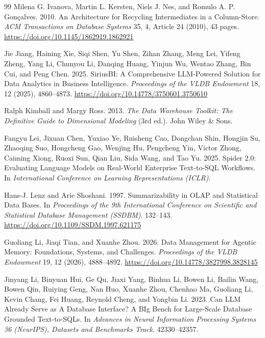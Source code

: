 \begin{thebibliography}{99}
Milena G. Ivanova, Martin L. Kersten, Niels J. Nes, and Romulo A. P. Gon{\c{c}}alves. 2010. An Architecture for Recycling Intermediates in a Column-Store. \emph{ACM Transactions on Database Systems} 35, 4, Article 24 (2010), 43 pages. \url{https://doi.org/10.1145/1862919.1862921}

Jie Jiang, Haining Xie, Siqi Shen, Yu Shen, Zihan Zhang, Meng Lei, Yifeng Zheng, Yang Li, Chunyou Li, Danqing Huang, Yinjun Wu, Wentao Zhang, Bin Cui, and Peng Chen. 2025. SiriusBI: A Comprehensive LLM-Powered Solution for Data Analytics in Business Intelligence. \emph{Proceedings of the VLDB Endowment} 18, 12 (2025), 4860--4873. \url{https://doi.org/10.14778/3750601.3750610}

Ralph Kimball and Margy Ross. 2013. \emph{The Data Warehouse Toolkit: The Definitive Guide to Dimensional Modeling} (3rd ed.). John Wiley \& Sons.

Fangyu Lei, Jixuan Chen, Yuxiao Ye, Ruisheng Cao, Dongchan Shin, Hongjin Su, Zhaoqing Suo, Hongcheng Gao, Wenjing Hu, Pengcheng Yin, Victor Zhong, Caiming Xiong, Ruoxi Sun, Qian Liu, Sida Wang, and Tao Yu. 2025. Spider 2.0: Evaluating Language Models on Real-World Enterprise Text-to-SQL Workflows. In \emph{International Conference on Learning Representations (ICLR)}.

Hans-J. Lenz and Arie Shoshani. 1997. Summarizability in OLAP and Statistical Data Bases. In \emph{Proceedings of the 9th International Conference on Scientific and Statistical Database Management (SSDBM)}. 132--143. \url{https://doi.org/10.1109/SSDM.1997.621175}

Guoliang Li, Jiaqi Tian, and Xuanhe Zhou. 2026. Data Management for Agentic Memory: Foundations, Systems, and Challenges. \emph{Proceedings of the VLDB Endowment} 19, 12 (2026), 4888--4892. \url{https://doi.org/10.14778/3827998.3828145}

Jinyang Li, Binyuan Hui, Ge Qu, Jiaxi Yang, Binhua Li, Bowen Li, Bailin Wang, Bowen Qin, Ruiying Geng, Nan Huo, Xuanhe Zhou, Chenhao Ma, Guoliang Li, Kevin Chang, Fei Huang, Reynold Cheng, and Yongbin Li. 2023. Can LLM Already Serve as A Database Interface? A BIg Bench for Large-Scale Database Grounded Text-to-SQLs. In \emph{Advances in Neural Information Processing Systems 36 (NeurIPS), Datasets and Benchmarks Track}. 42330--42357.


\end{thebibliography}
